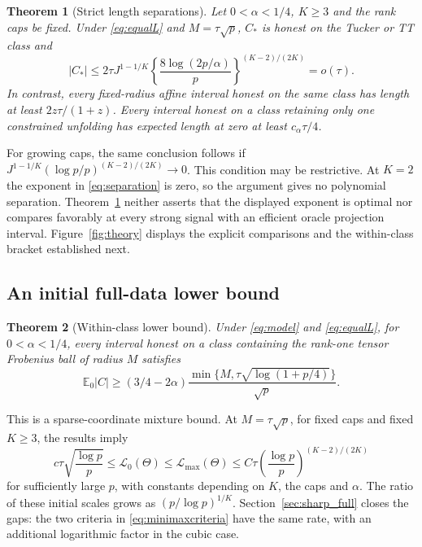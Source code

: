 \documentclass[11pt]{article}
\newtheorem{theorem}{Theorem}
\theoremstyle{remark}
\newcommand{\E}{\mathbb E}
\newcommand{\calL}{\mathcal L}
\begin{document}
\begin{theorem}[Strict length separations]\label{thm:separation}
Let $0<\alpha<1/4$, $K\ge3$ and the rank caps be fixed. Under \eqref{eq:equalL} and $M=\tau\sqrt p$, $C_*$ is honest on the Tucker or TT class and
\begin{equation}\label{eq:separation}
 |C_*|\le2\tau J^{1-1/K}
 \left\{\frac{8\log(2p/\alpha)}p\right\}^{(K-2)/(2K)}=o(\tau).
\end{equation}
In contrast, every fixed-radius affine interval honest on the same class has length at least $2z\tau/(1+z)$. Every interval honest on a class retaining only one constrained unfolding has expected length at zero at least $c_\alpha\tau/4$.
\end{theorem}

For growing caps, the same conclusion follows if $J^{1-1/K}(\log p/p)^{(K-2)/(2K)}\to0$. This condition may be restrictive. At $K=2$ the exponent in \eqref{eq:separation} is zero, so the argument gives no polynomial separation. Theorem~\ref{thm:separation} neither asserts that the displayed exponent is optimal nor compares favorably at every strong signal with an efficient oracle projection interval. Figure~\ref{fig:theory} displays the explicit comparisons and the within-class bracket established next.

\subsection{An initial full-data lower bound}\label{sec:gap}

\begin{theorem}[Within-class lower bound]\label{thm:jointlower}
Under \eqref{eq:model} and \eqref{eq:equalL}, for $0<\alpha<1/4$, every interval honest on a class containing the rank-one tensor Frobenius ball of radius $M$ satisfies
\begin{equation}\label{eq:jointlower}
 \E_0|C|\ge(3/4-2\alpha)
 \frac{\min\{M,\tau\sqrt{\log(1+p/4)}\}}{\sqrt p}.
\end{equation}
\end{theorem}

This is a sparse-coordinate mixture bound. At $M=\tau\sqrt p$, for fixed caps and fixed $K\ge3$, the results imply
\begin{equation}\label{eq:gap}
 c\tau\sqrt{\frac{\log p}p}
 \le\calL_0(\Theta)\le\calL_{\max}(\Theta)
 \le C\tau\left(\frac{\log p}p\right)^{(K-2)/(2K)}
\end{equation}
for sufficiently large $p$, with constants depending on $K$, the caps and $\alpha$. The ratio of these initial scales grows as $(p/\log p)^{1/K}$. Section~\ref{sec:sharp_full} closes the gaps: the two criteria in \eqref{eq:minimaxcriteria} have the same rate, with an additional logarithmic factor in the cubic case.
\end{document}
